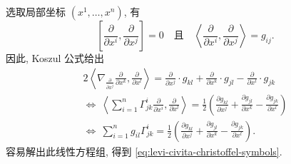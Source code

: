 \begin{RiemannProof}
选取局部坐标 $(x^1,\ldots,x^n)$, 有
\[
  \left[\frac{\partial}{\partial x^i},\frac{\partial}{\partial x^j}\right]=0
  \quad\text{且}\quad
  \left\langle\frac{\partial}{\partial x^i},\frac{\partial}{\partial x^j}\right\rangle=g_{ij}.
\]
因此, Koszul 公式给出
\begin{gather*}
  2\left\langle\nabla_{\frac{\partial}{\partial x^j}}\frac{\partial}{\partial x^k},
    \frac{\partial}{\partial x^l}\right\rangle
    =\frac{\partial}{\partial x^j}\cdot g_{kl}
     +\frac{\partial}{\partial x^k}\cdot g_{jl}
     -\frac{\partial}{\partial x^l}\cdot g_{jk}\\
  \Leftrightarrow\
  \left\langle\sum_{i=1}^n\Gamma^i_{jk}\frac{\partial}{\partial x^i},
    \frac{\partial}{\partial x^l}\right\rangle
    =\frac12\left(\frac{\partial g_{kl}}{\partial x^j}
                 +\frac{\partial g_{jl}}{\partial x^k}
                 -\frac{\partial g_{jk}}{\partial x^l}\right)\\
  \Leftrightarrow\
  \sum_{i=1}^n g_{il}\Gamma^i_{jk}
    =\frac12\left(\frac{\partial g_{kl}}{\partial x^j}
                 +\frac{\partial g_{jl}}{\partial x^k}
                 -\frac{\partial g_{jk}}{\partial x^l}\right).
\end{gather*}
容易解出此线性方程组, 得到 \eqref{eq:levi-civita-christoffel-symbols}.
\end{RiemannProof}

